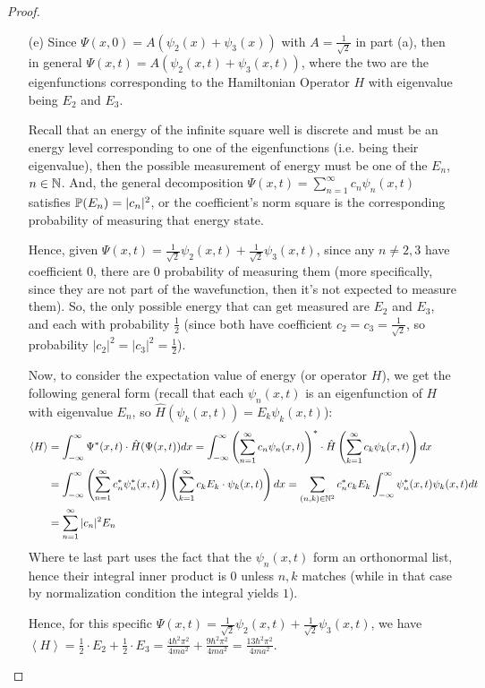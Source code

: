 \documentclass{article}
\begin{document}
\begin{proof}
\begin{itemize}
        \hfil

        \item[(e)] Since $\Psi(x,0) = A(\psi_2(x)+\psi_3(x))$ with $A=\frac{1}{\sqrt{2}}$ in part (a), then in general $\Psi(x,t)=A(\psi_2(x,t)+\psi_3(x,t))$, where the two are the eigenfunctions corresponding to the Hamiltonian Operator $H$ with eigenvalue being $E_2$ and $E_3$.
        
        Recall that an energy of the infinite square well is discrete and must be an energy level corresponding to one of the eigenfunctions (i.e. being their eigenvalue), then the possible measurement of energy must be one of the $E_n$, $n\in\mathbb{N}$. And, the general decomposition $\Psi(x,t)=\sum_{n=1}^{\infty}c_n \psi_n(x,t)$ satisfies $\mathbb{P}(E_n)=|c_n|^2$, or the coefficient's norm square is the corresponding probability of measuring that energy state. 

        Hence, given $\Psi(x,t)= \frac{1}{\sqrt{2}}\psi_2(x,t)+\frac{1}{\sqrt{2}}\psi_3(x,t)$, since any $n\neq 2,3$ have coefficient $0$, there are $0$ probability of measuring them (more specifically, since they are not part of the wavefunction, then it's not expected to measure them). So, the only possible energy that can get measured are $E_2$ and $E_3$, and each with probability $\frac{1}{2}$ (since both have coefficient $c_2=c_3=\frac{1}{\sqrt{2}}$, so probability $|c_2|^2=|c_3|^2=\frac{1}{2}$).

        Now, to consider the expectation value of energy (or operator $H$), we get the following general form (recall that each $\psi_n(x,t)$ is an eigenfunction of $H$ with eigenvalue $E_n$, so $\hat{H}(\psi_k(x,t))=E_k \psi_k(x,t)$):
        \begin{align}
            \left<H\right> &= \int_{-\infty}^{\infty}\Psi^*(x,t)\cdot \hat{H}(\Psi(x,t))dx=\int_{-\infty}^{\infty}\left(\sum_{n=1}^{\infty}c_n \psi_n(x,t)\right)^*\cdot\hat{H}\left(\sum_{k=1}^{\infty}c_k \psi_k(x,t)\right)dx\\
            &= \int_{-\infty}^{\infty}\left(\sum_{n=1}^{\infty}c_n^* \psi_n^*(x,t)\right)\left(\sum_{k=1}^{\infty}c_k E_k \cdot \psi_k(x,t)\right)dx = \sum_{(n,k)\in\mathbb{N}^2}c_n^* c_k E_k\int_{-\infty}^{\infty}\psi_n^*(x,t)\psi_k(x,t)dt\\
            &= \sum_{n=1}^{\infty}|c_n|^2E_n 
        \end{align}
        Where te last part uses the fact that the $\psi_n(x,t)$ form an orthonormal list, hence their integral inner product is $0$ unless $n,k$ matches (while in that case by normalization condition the integral yields $1$).

        Hence, for this specific $\Psi(x,t)=\frac{1}{\sqrt{2}}\psi_2(x,t)+\frac{1}{\sqrt{2}}\psi_3(x,t)$, we have $\left<H\right>=\frac{1}{2}\cdot E_2+\frac{1}{2}\cdot E_3 = \frac{4\hbar^2\pi^2}{4ma^2}+\frac{9\hbar^2\pi^2}{4ma^2} = \frac{13\hbar^2\pi^2}{4ma^2}$.
    \end{itemize}
\end{proof}
\end{document}
